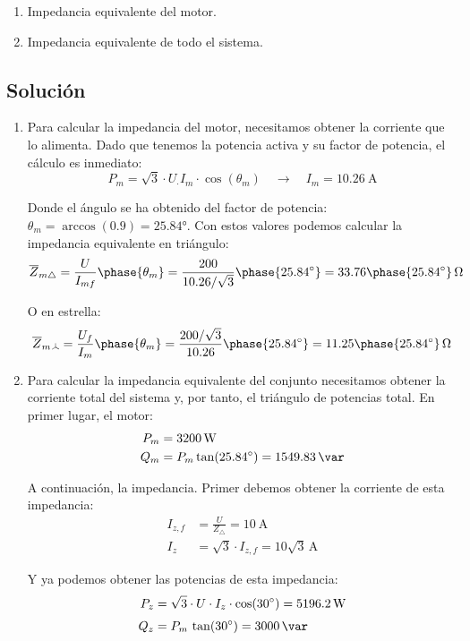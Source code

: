 \begin{enumerate}
\item Impedancia equivalente del motor.
\item Impedancia equivalente de todo el sistema.
\end{enumerate}

\subsection*{Solución}

\begin{enumerate}
\item Para calcular la impedancia del motor, necesitamos obtener la corriente que lo alimenta. Dado que tenemos la potencia activa y su factor de potencia, el cálculo es inmediato:
  \[
    P_m = \sqrt{3} \cdot U_ \cdot I_m \cdot \cos(\theta_m) \quad\rightarrow\quad I_m = \qty{10.26}{\ampere}
  \]
  
Donde el ángulo se ha obtenido del factor de potencia: $\theta_m = \arccos(0.9) = \ang{25.84}$.
  Con estos valores podemos calcular la impedancia equivalente en triángulo:
  \[
    \overline{Z}_{m\triangle} = \frac{U}{I_{mf}}\phase{\theta_m} = \frac{200}{10.26/\sqrt{3}}\phase{\ang{25.84}} = 33.76\phase{\ang{25.84}}\,\unit{\ohm}
  \]

  O en estrella:
\[
  \overline{Z}_{m\wye} = \frac{U_f}{I_{m}}\phase{\theta_m} = \frac{200/\sqrt{3}}{10.26}\phase{\ang{25.84}} = 11.25\phase{\ang{25.84}}\,\unit{\ohm}
  \]
 
\item Para calcular la impedancia equivalente del conjunto necesitamos obtener la corriente total del sistema y, por tanto, el triángulo de potencias total. En primer lugar, el motor:
  \begin{align*}
    P_m &= \qty{3200}{\watt}\\
    Q_m &= P_m \tan(25.84^\circ) = \qty{1549.83}{\var}
  \end{align*}

  A continuación, la impedancia. Primer debemos obtener la corriente de esta impedancia:
  \begin{align*}
    I_{z,f} &= \frac{U}{Z_\triangle} = \qty{10}{\ampere}\\[3pt]
    I_z &= \sqrt{3}\cdot I_{z,f} = 10\sqrt{3}\,\unit{\ampere}
  \end{align*}
  
  Y ya podemos obtener las potencias de esta impedancia:
  \begin{align*}
    P_z &= \sqrt{3}\cdot U \cdot I_z \cdot \cos(\ang{30}) = \qty{5196.2}{\watt}\\[3pt]
    Q_z &= P_m \, \tan(\ang{30}) = \qty{3000}{\var}
  \end{align*}


\end{enumerate}
